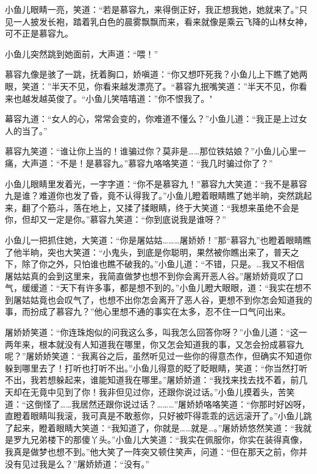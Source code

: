 \documentclass[12pt,oneside]{book}
\begin{document}
小鱼儿眼睛一亮，笑道：``若是慕容九，来得倒正好，我正想我她，她就来了。''只见一人披发长袍，踏着乳白色的晨雾飘飘而来，看来就像是乘云飞降的山林女神，可不正是慕容九。

小鱼儿突然跳到她面前，大声道：``喂！''

慕容九像是骇了一跳，抚着胸口，娇嗔道：``你又想吓死我？小鱼儿上下瞧了她两眼，笑道：''半天不见，你看来越发漂亮了。``慕容九抿嘴笑道：''半天不见，你看来也越发越英俊了。``小鱼儿笑嘻嘻道：''你不恨我了。"

幕容九道：``女人的心，常常会变的，你难道不懂么？''小鱼儿道：``我正是上过女人的当了。''

慕容九笑道：``谁让你上当的！谁骗过你？莫非是\ldots\ldots 那位铁姑娘？''小鱼儿心里一痛，大声道：``不是！是慕容九。''慕容九咯咯笑道：``我几时骗过你了？''

小鱼儿眼睛里发着光，一字字道：``你不是慕容九！''慕容九大笑道：``我不是慕容九是谁？难道你也发了昏，竟不认得我了。''小鱼儿瞪着眼睛瞧了她半晌，突然跳起来，翻了个筋斗，落在地上，又揉了揉眼睛，终于大笑道：``我想来虽绝不会是你，但却又一定是你。''慕容九笑道：``你到底说我是谁呀？''

小鱼儿一把抓住她，大笑道：``你是屠姑姑\ldots\ldots\ldots 屠娇娇！''那``慕容九''也瞪着眼睛瞧了他半晌，突也大笑道：``小鬼头，到底是你聪明，果然被你瞧出来了，普天之下，除了你之外，只怕谁也瞧不破我的。''小鱼儿道：``不错，只是。\ldots 我又不相信屠姑姑真的会到这里来，我简直做梦也想不到你会离开恶人谷。''屠娇娇竟叹了口气，缓缓道：``天下有许多事，都是想不到的。''小鱼儿瞪大眼眼，道：``我实在想不到屠姑姑竟也会叹气了，也想不出你怎会离开了恶人谷，更想不到你怎会知道我的事，而扮成了慕容九？''他心里想不通的事实在太多，忍不住一口气问出来。

屠娇娇笑道：``你连珠炮似的问我这么多，叫我怎么回答你呀？''小鱼儿道：``这一两年来，根本就没有人知道我在哪里，你又怎会知道我的事，又怎会扮成慕容九呢？''屠娇娇笑道：``我离谷之后，虽然听见过一些你的得意杰作，但确实不知道你躲到哪里去了！打听也打听不出。''小鱼儿得意的眨了眨眼睛，笑道：``你当然打听不出，我若想躲起来，谁能知道我在哪里。''屠娇娇道：``我找来找去找不着，前几天却在无竟中见到了你！我非但见过你，还跟你说过话。''小鱼儿摸着头，苦笑道：``这倒怪了\ldots\ldots 我居然还跟你说过话？\ldots\ldots\ldots{}''屠娇娇咯咯笑道：``你那时好凶呀，直瞪着眼睛叫我滚，我可真是不敢惹你，只好被吓得乖乖的远远滚开了。''小鱼儿跳了起来，瞪着眼睛大笑道：``我知道了，你就是\ldots\ldots 就是\ldots。''屠娇娇悠然笑道：``我就是罗九兄弟楼下的那傻丫头。''小鱼儿大笑道：``我实在佩服你，你实在装得真像，我真是做梦也想不到。''他大笑了一阵突又顿住笑声，问道：``但在那天之前，你并没有见过我是么？''屠娇娇道：``没有。''
\end{document}
